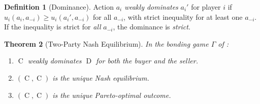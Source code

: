 \documentclass[11pt,a4paper]{article}
\newtheorem{theorem}{Theorem}[section]
\theoremstyle{definition}
\newtheorem{definition}[theorem]{Definition}
\theoremstyle{remark}
\DeclareMathOperator{\Coop}{C}
\DeclareMathOperator{\Def}{D}
\begin{document}
\begin{definition}[Dominance]
\label{def:dominance}
Action $a_i$ \emph{weakly dominates} $a_i'$ for player $i$ if
$u_i(a_i, a_{-i}) \geq u_i(a_i', a_{-i})$ for all $a_{-i}$, with
strict inequality for at least one $a_{-i}$. If the inequality is
strict for \emph{all} $a_{-i}$, the dominance is \emph{strict}.
\end{definition}

\begin{theorem}[Two-Party Nash Equilibrium]
\label{thm:two-party-nash}
In the bonding game $\Gamma$ of :
\begin{enumerate}[label=(\alph*)]
  \item $\Coop$ weakly dominates $\Def$ for both the buyer and
    the seller.
  \item $(\Coop, \Coop)$ is the unique Nash equilibrium.
  \item $(\Coop, \Coop)$ is the unique Pareto-optimal outcome.
\end{enumerate}
\end{theorem}
\end{document}
